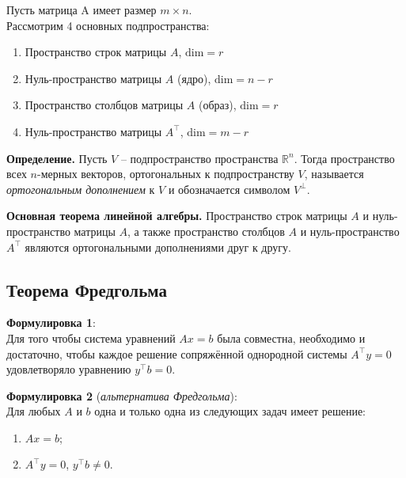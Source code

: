 \documentclass[11pt,a4paper]{article}
\providecommand{\tightlist}{%
  \setlength{\itemsep}{0pt}\setlength{\parskip}{0pt}}
\begin{document}
Пусть матрица A имеет размер \(m \times n\).\\
Рассмотрим 4 основных подпространства:

\begin{enumerate}
\def\labelenumi{\arabic{enumi}.}
\tightlist
\item
  Пространство строк матрицы \(A\), \(\mathrm{dim} = r\)
\item
  Нуль-пространство матрицы \(A\) (ядро), \(\mathrm{dim} = n-r\)
\item
  Пространство столбцов матрицы \(A\) (образ), \(\mathrm{dim} = r\)
\item
  Нуль-пространство матрицы \(A^\top\), \(\mathrm{dim} = m-r\)
\end{enumerate}

    \textbf{Определение.} Пусть \(V\) -- подпространство пространства
\(\mathbb{R}^n\). Тогда пространство всех \(n\)-мерных векторов,
ортогональных к подпространству \(V\), называется \emph{ортогональным
дополнением} к \(V\) и обозначается символом \(V^\perp\).

\textbf{Основная теорема линейной алгебры.} Пространство строк матрицы \(A\) и нуль-пространство матрицы \(A\), а также пространство столбцов \(A\) и нуль-пространство \(A^\top\) являются ортогональными дополнениями друг к другу.

\begin{center}
\end{center}


    \hypertarget{ux442ux435ux43eux440ux435ux43cux430-ux444ux440ux435ux434ux433ux43eux43bux44cux43cux430}{%
\subsection{Теорема
Фредгольма}\label{ux442ux435ux43eux440ux435ux43cux430-ux444ux440ux435ux434ux433ux43eux43bux44cux43cux430}}

\textbf{Формулировка 1}:\\
Для того чтобы система уравнений \(Ax=b\) была совместна, необходимо и
достаточно, чтобы каждое решение сопряжённой однородной системы
\(A^\top y = 0\) удовлетворяло уравнению \(y^\top b = 0\).

\textbf{Формулировка 2} (\emph{альтернатива Фредгольма}):\\
Для любых \(A\) и \(b\) одна и только одна из следующих задач имеет
решение:

\begin{enumerate}
\def\labelenumi{\arabic{enumi}.}
\tightlist
\item
  \(Ax = b\);
\item
  \(A^\top y = 0\), \(y^\top b \ne 0\).
\end{enumerate}
\end{document}
